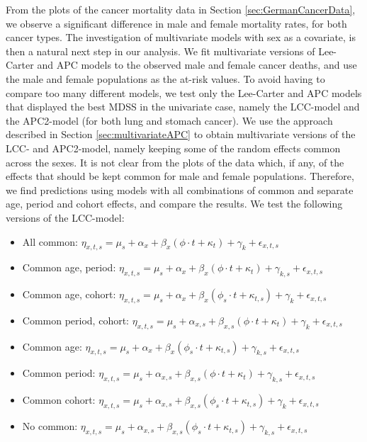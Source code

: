 From the plots of the cancer mortality data in Section \ref{sec:GermanCancerData}, we observe a significant difference in male and female mortality rates, for both cancer types. The investigation of multivariate models with sex as a covariate, is then a natural next step in our analysis. We fit multivariate versions of Lee-Carter and APC models to the observed male and female cancer deaths, and use the male and female populations as the at-risk values. To avoid having to compare too many different models, we test only the Lee-Carter and APC models that displayed the best MDSS in the univariate case, namely the LCC-model and the APC2-model (for both lung and stomach cancer). We use the approach described in Section \ref{sec:multivariateAPC} to obtain multivariate versions of the LCC- and APC2-model, namely keeping some of the random effects common across the sexes. It is not clear from the plots of the data which, if any, of the effects that should be kept common for male and female populations. Therefore, we find predictions using models with all combinations of common and separate age, period and cohort effects, and compare the results. We test the following versions of the LCC-model:
\begin{itemize}
    \item All common: $\eta_{x,t,s} = \mu_s + \alpha_x + \beta_x(\phi\cdot t + \kappa_t) + \gamma_k + \epsilon_{x,t,s}$
    \item Common age, period: $\eta_{x,t,s} = \mu_s + \alpha_x + \beta_x(\phi\cdot t + \kappa_t) + \gamma_{k,s} + \epsilon_{x,t,s}$
    \item Common age, cohort: $\eta_{x,t,s} = \mu_s + \alpha_x + \beta_x(\phi_s\cdot t + \kappa_{t,s}) + \gamma_{k} + \epsilon_{x,t,s}$
    \item Common period, cohort: $\eta_{x,t,s} = \mu_s + \alpha_{x,s} + \beta_{x,s}(\phi\cdot t + \kappa_t) + \gamma_{k} + \epsilon_{x,t,s}$
    \item Common age: $\eta_{x,t,s} = \mu_s + \alpha_x + \beta_x(\phi_s\cdot t + \kappa_{t,s}) + \gamma_{k,s} + \epsilon_{x,t,s}$
    \item Common period: $\eta_{x,t,s} = \mu_s + \alpha_{x,s} + \beta_{x,s}(\phi\cdot t + \kappa_{t}) + \gamma_{k,s} + \epsilon_{x,t,s}$
    \item Common cohort: $\eta_{x,t,s} = \mu_s + \alpha_{x,s} + \beta_{x,s}(\phi_s\cdot t + \kappa_{t,s}) + \gamma_{k} + \epsilon_{x,t,s}$
    \item No common: $\eta_{x,t,s} = \mu_s + \alpha_{x,s} + \beta_{x,s}(\phi_s\cdot t + \kappa_{t,s}) + \gamma_{k,s} + \epsilon_{x,t,s}$
\end{itemize}
